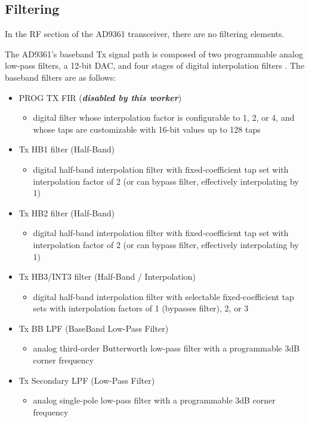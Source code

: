 \subsection*{Filtering}
In the RF section of the AD9361 transceiver, there are no filtering elements.\par\medskip
\noindent The AD9361's baseband Tx
signal path is composed of two programmable analog low-pass
filters, a 12-bit DAC, and four stages of digital interpolation
filters \cite{adi_ug570}.
\noindent The baseband filters are as follows:
\begin{itemize}
\item PROG TX FIR (\textit{\textbf{disabled by this worker}})
\begin{itemize}
\item digital filter whose interpolation factor is configurable to 1, 2, or 4, and whose taps are customizable with 16-bit values up to 128 taps
\end{itemize}
\item Tx HB1 filter (Half-Band)
\begin{itemize}
\item digital half-band interpolation filter with fixed-coefficient tap set with interpolation factor of 2 (or can bypass filter, effectively interpolating by 1)
\end{itemize}
\item Tx HB2 filter (Half-Band)
\begin{itemize}
\item digital half-band interpolation filter with fixed-coefficient tap set with interpolation factor of 2 (or can bypass filter, effectively interpolating by 1)
\end{itemize}
\item Tx HB3/INT3 filter (Half-Band / Interpolation)
\begin{itemize}
\item digital half-band interpolation filter with selectable fixed-coefficient tap sets with interpolation factors of 1 (bypasses filter), 2, or 3
\end{itemize}
\item Tx BB LPF (BaseBand Low-Pass Filter)
\begin{itemize}
\item analog third-order Butterworth low-pass filter with a programmable 3dB corner frequency
\end{itemize}
\item Tx Secondary LPF (Low-Pass Filter)
\begin{itemize}
\item analog single-pole low-pass filter with a programmable 3dB corner frequency
\end{itemize}
\end{itemize}
